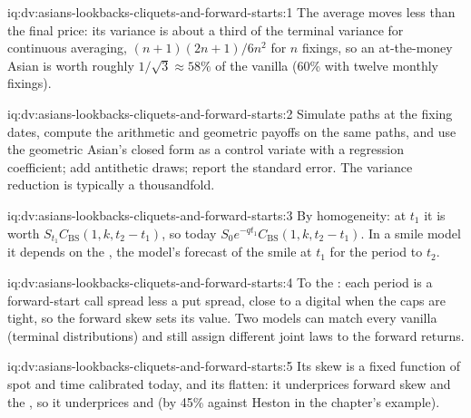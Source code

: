 \begin{solution}{iq:dv:asians-lookbacks-cliquets-and-forward-starts:1}
The average moves less than the final price: its variance is about a third of the terminal variance for continuous
averaging, $(n+1)(2n+1)/6n^2$ for $n$ fixings, so an at-the-money Asian is worth roughly $1/\sqrt3\approx58\%$ of the vanilla
(60\% with twelve monthly fixings).
\end{solution}

\begin{solution}{iq:dv:asians-lookbacks-cliquets-and-forward-starts:2}
Simulate paths at the fixing dates, compute the arithmetic and geometric payoffs on the same paths, and use the geometric
Asian's closed form as a control variate with a regression coefficient; add antithetic draws; report the standard
error. The variance reduction is typically a thousandfold.
\end{solution}

\begin{solution}{iq:dv:asians-lookbacks-cliquets-and-forward-starts:3}
By homogeneity: at $t_1$ it is worth $S_{t_1}C_{\mathrm{BS}}(1,k,t_2-t_1)$, so today $S_0e^{-qt_1}C_{\mathrm{BS}}(1,k,t_2-t_1)$. In a
smile model it depends on the , the model's forecast of the smile at $t_1$ for the period to $t_2$.
\end{solution}

\begin{solution}{iq:dv:asians-lookbacks-cliquets-and-forward-starts:4}
To the : each period is a forward-start call spread less a put spread, close to a digital when the caps are
tight, so the forward skew sets its value. Two models can match every vanilla (terminal distributions) and still assign
different joint laws to the forward returns.
\end{solution}

\begin{solution}{iq:dv:asians-lookbacks-cliquets-and-forward-starts:5}
Its skew is a fixed function of spot and time calibrated today, and its  flatten: it underprices forward
skew and the , so it underprices  and  (by 45\% against Heston in the
chapter's example).
\end{solution}

